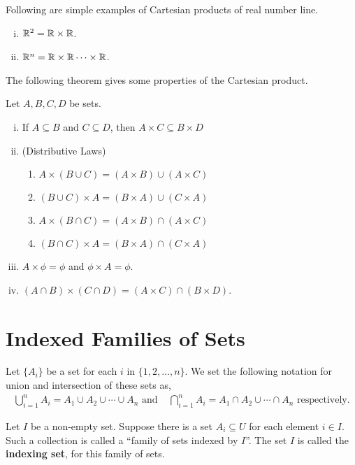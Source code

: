 \documentclass[a4paper,english,12pt]{article}
\begin{document}
\begin{exmp} Following are simple examples of Cartesian products of real number line.
\begin{enumerate}[(i)]
\item $\mathbb{R}^{2} = \mathbb{R} \times \mathbb{R}$.
\item $\mathbb{R}^{n} = \mathbb{R} \times \mathbb{R} \dots \times \mathbb{R}$.
\end{enumerate}
\end{exmp}

The following theorem gives some properties of the Cartesian product.
\begin{thm}
 Let $A, B, C, D$ be sets.
 \begin{enumerate}[i)]
  \item If $A \subseteq B$ and $C \subseteq D$, then $A \times C \subseteq B \times D$
  \item (Distributive Laws)
  \begin{enumerate}
   \item $A \times (B \cup C) = (A \times B) \cup (A \times C)$ 
   \item $(B \cup C) \times A = (B \times A) \cup (C \times A)$
   \item $A \times (B \cap C) = (A \times B) \cap (A \times C)$
   \item $(B \cap C) \times A = (B \times A) \cap (C \times A)$
  \end{enumerate}
  \item $A \times \phi = \phi$ and $\phi \times A = \phi$.
  \item $(A \cap B) \times (C \cap D) = (A \times C) \cap (B \times D)$.
\end{enumerate}

\end{thm}

\section{Indexed Families of Sets}
Let $\{A_i\}$ be a set for each $i$ in $\{1,2,\ldots,n\}$. We set the following notation for union and intersection of these sets as, 
\begin{align*}
 \bigcup_{i = 1}^{n} A_{i} = A_{1} \cup A_{2} \cup \cdots \cup A_{n} \text{ and }& 
 \bigcap_{i = 1}^{n} A_{i} = A_{1} \cap A_{2} \cup \cdots \cap A_{n} \text{ respectively}.
\end{align*}

\begin{defn}
 Let $I$ be a non-empty set. Suppose there is a set $A_{i} \subseteq U$ for each element $i \in I$. Such a collection is called a ``family of sets indexed by $I$''. The set $I$ is called the \textbf{indexing set}, for this family of sets. 
\end{defn}
\end{document}
